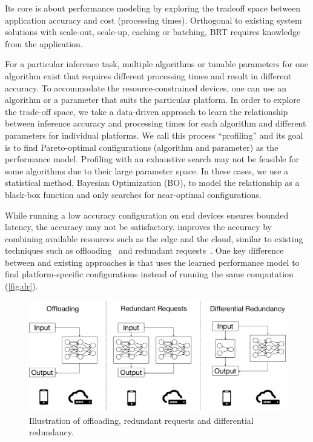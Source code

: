 Its core is about performance modeling by exploring the tradeoff space between
application accuracy and cost (processing times). Orthogonal to existing system
solutions with scale-out, scale-up, caching or batching, BRT requires knowledge
from the application.

 For a particular inference task, multiple
algorithms or tunable parameters for one algorithm exist that requires different
processing times and result in different accuracy. To accommodate the
resource-constrained devices, one can use an algorithm or a parameter that suits
the particular platform. In order to explore the trade-off space, we take a
data-driven approach to learn the relationship between inference accuracy and
processing times for each algorithm and different parameters for individual
platforms. We call this process ``profiling'' and its goal is to find
Pareto-optimal configurations (algorithm and parameter) as the performance
model. Profiling with an exhaustive search may not be feasible for some
algorithms due to their large parameter space. In these cases, we use a
statistical method, Bayesian Optimization (BO), to model the relationship as a
black-box function and only searches for near-optimal configurations.

 While running a low accuracy configuration
on end devices ensures bounded latency, the accuracy may not be
satisfactory. \brt{} improves the accuracy by combining available resources
such as the edge and the cloud, similar to existing techniques such as
offloading~\cite{chun2011clonecloud,cuervo2010maui} and redundant
requests~\cite{ananthanarayanan2013effective, dean2013tail,
  gordon2015accelerating, vulimiri2013low}. One key difference between
\brt{} and existing approaches is that \brt{} uses the learned
performance model to find platform-specific configurations instead of running
the same computation (\autoref{fig:dr}).

\begin{figure}
  \centering
  \includegraphics[width=\columnwidth]{figures/dr.pdf}
  \caption{Illustration of offloading, redundant requests and differential
    redundancy.}
  \label{fig:dr}
\end{figure}


